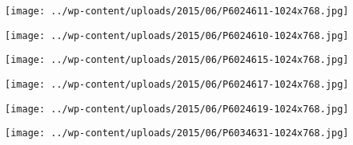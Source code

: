  \newline
\centerline{\texttt{[image: ../wp-content/uploads/2015/06/P6024611-1024x768.jpg]} } 
 \newline
 \newline
\centerline{\texttt{[image: ../wp-content/uploads/2015/06/P6024610-1024x768.jpg]} } 
 \newline
 \newline
\centerline{\texttt{[image: ../wp-content/uploads/2015/06/P6024615-1024x768.jpg]} } 
 \newline
 \newline
\centerline{\texttt{[image: ../wp-content/uploads/2015/06/P6024617-1024x768.jpg]} } 
 \newline
 \newline
\centerline{\texttt{[image: ../wp-content/uploads/2015/06/P6024619-1024x768.jpg]} } 
 \newline
 \newline
\centerline{\texttt{[image: ../wp-content/uploads/2015/06/P6034631-1024x768.jpg]} } 
 \newline

\newpage
 
